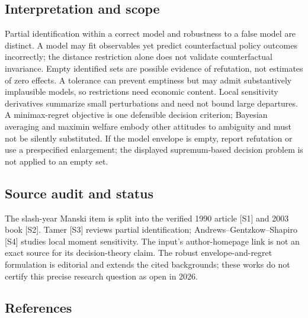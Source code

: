 \documentclass[11pt,a4paper]{article}
\begin{document}
\subsection*{Interpretation and scope}

Partial identification within a correct model and robustness to a false model are distinct. A model may fit observables yet predict counterfactual policy outcomes incorrectly; the distance restriction alone does not validate counterfactual invariance. Empty identified sets are possible evidence of refutation, not estimates of zero effects. A tolerance can prevent emptiness but may admit substantively implausible models, so restrictions need economic content. Local sensitivity derivatives summarize small perturbations and need not bound large departures. A minimax-regret objective is one defensible decision criterion; Bayesian averaging and maximin welfare embody other attitudes to ambiguity and must not be silently substituted. If the model envelope is empty, report refutation or use a prespecified enlargement; the displayed supremum-based decision problem is not applied to an empty set.

\subsection*{Source audit and status}

The slash-year Manski item is split into the verified 1990 article [S1] and 2003 book [S2]. Tamer [S3] reviews partial identification; Andrews--Gentzkow--Shapiro [S4] studies local moment sensitivity. The input's author-homepage link is not an exact source for its decision-theory claim. The robust envelope-and-regret formulation is editorial and extends the cited backgrounds; these works do not certify this precise research question as open in 2026.

\subsection*{References}
\end{document}
